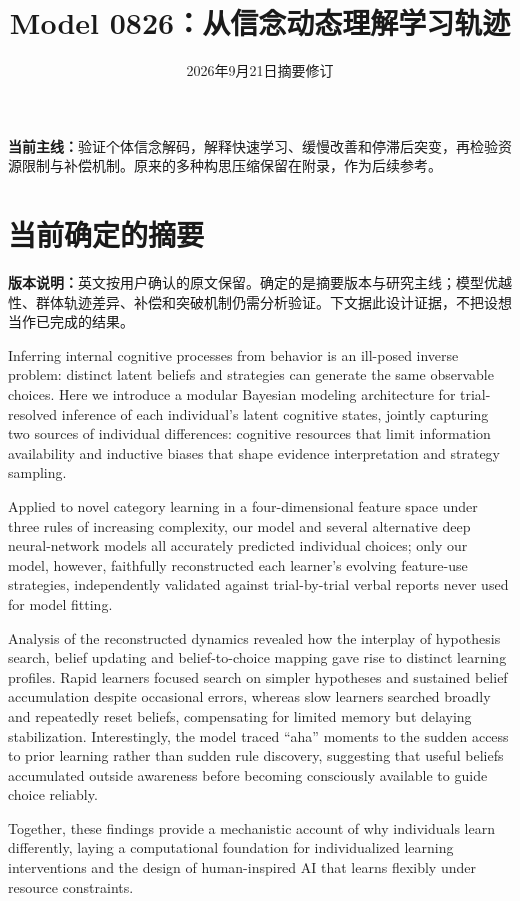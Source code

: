 \documentclass[12pt]{article}
\title{Model 0826：从信念动态理解学习轨迹}
\author{}
\date{2026年9月21日摘要修订}
\begin{document}
\maketitle

\noindent\textbf{当前主线：}验证个体信念解码，解释快速学习、缓慢改善和停滞后突变，再检验资源限制与补偿机制。原来的多种构思压缩保留在附录，作为后续参考。

\section{当前确定的摘要}
\label{sec:abstract}
\noindent\textbf{版本说明：}英文按用户确认的原文保留。确定的是摘要版本与研究主线；模型优越性、群体轨迹差异、补偿和突破机制仍需分析验证。下文据此设计证据，不把设想当作已完成的结果。

\begingroup\abstractfont
Inferring internal cognitive processes from behavior is an ill-posed inverse problem: distinct latent beliefs and strategies can generate the same observable choices. Here we introduce a modular Bayesian modeling architecture for trial-resolved inference of each individual’s latent cognitive states, jointly capturing two sources of individual differences: cognitive resources that limit information availability and inductive biases that shape evidence interpretation and strategy sampling.

Applied to novel category learning in a four-dimensional feature space under three rules of increasing complexity, our model and several alternative deep neural-network models all accurately predicted individual choices; only our model, however, faithfully reconstructed each learner’s evolving feature-use strategies, independently validated against trial-by-trial verbal reports never used for model fitting.

Analysis of the reconstructed dynamics revealed how the interplay of hypothesis search, belief updating and belief-to-choice mapping gave rise to distinct learning profiles. Rapid learners focused search on simpler hypotheses and sustained belief accumulation despite occasional errors, whereas slow learners searched broadly and repeatedly reset beliefs, compensating for limited memory but delaying stabilization. Interestingly, the model traced “aha” moments to the sudden access to prior learning rather than sudden rule discovery, suggesting that useful beliefs accumulated outside awareness before becoming consciously available to guide choice reliably.

Together, these findings provide a mechanistic account of why individuals learn differently, laying a computational foundation for individualized learning interventions and the design of human-inspired AI that learns flexibly under resource constraints.
\par\endgroup
\clearpage
\end{document}
